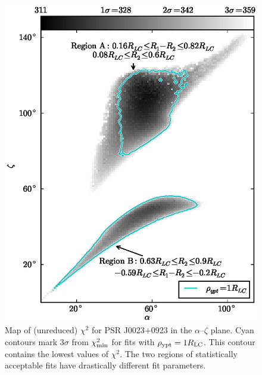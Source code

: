 \begin{figure}[t!!]
\begin{center}
\includegraphics[scale=.8]{chapters/applicationOfNumericalModel/figures/J0023+0923MapWyptRhoCut.eps}
\caption[Map of (unreduced) $\chi^{2}$ for PSR J0023$+$0923 in the $\alpha$--$\zeta$ plane]{\label{fig:J0023Map}
Map of (unreduced) $\chi^{2}$ for PSR J0023$+$0923 in the $\alpha$--$\zeta$ plane.  Cyan contours mark $3\sigma$ from $\chi^2_{\rm{min}}$ 
for fits with $\rho_{\rm{ypt}}=1R_{\rm{LC}}$.  This contour contains the lowest values of $\chi^2$.  The two
regions of statistically acceptable fits have drastically different fit parameters.
}
\end{center}
\end{figure}


